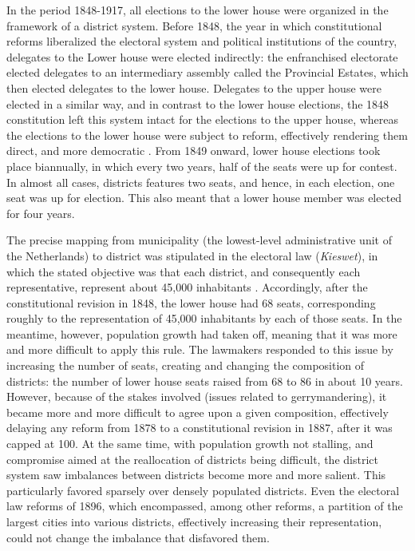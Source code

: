 \documentclass[12pt]{article}
\begin{document}
    In the period 1848-1917, all elections to the lower house were organized in the framework of a district system. Before 1848, the year in which constitutional reforms liberalized the electoral system and political institutions of the country, delegates to the Lower house were elected indirectly: the enfranchised electorate elected delegates to an intermediary assembly called the Provincial Estates, which then elected delegates to the lower house. Delegates to the upper house were elected in a similar way, and in contrast to the lower house elections, the 1848 constitution left this system intact for the elections to the upper house, whereas the elections to the lower house were subject to reform, effectively rendering them direct, and more democratic \citep{blok1987stemmen}. From 1849 onward, lower house elections took place biannually, in which every two years, half of the seats were up for contest. In almost all cases, districts features two seats, and hence, in each election, one seat was up for election. This also meant that a lower house member was elected for four years. 
    
    The precise mapping from municipality (the lowest-level administrative unit of the Netherlands) to district was stipulated in the electoral law (\textit{Kieswet}), in which the stated objective was that each district, and consequently each representative, represent about 45,000 inhabitants \citep{de1999van}. Accordingly, after the constitutional revision in 1848, the lower house had 68 seats, corresponding roughly to the representation of 45,000 inhabitants by each of those seats. In the meantime, however, population growth had taken off, meaning that it was more and more difficult to apply this rule. The lawmakers responded to this issue by increasing the number of seats, creating and changing the composition of districts: the number of lower house seats raised from 68 to 86 in about 10 years. However, because of the stakes involved (issues related to gerrymandering), it became more and more difficult to agree upon a given composition, effectively delaying any reform from 1878 to a constitutional revision in 1887, after it was capped at 100. At the same time, with population growth not stalling, and compromise aimed at the reallocation of districts being difficult, the district system saw imbalances between districts become more and more salient. This particularly favored sparsely over densely populated districts. Even the electoral law reforms of 1896, which encompassed, among other reforms, a partition of the largest cities into various districts, effectively increasing their representation, could not change the imbalance that disfavored them. 
\end{document}
